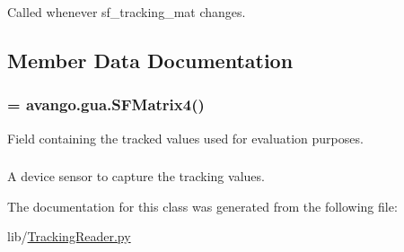 \-Called whenever sf\-\_\-tracking\-\_\-mat changes. 



\subsection{\-Member \-Data \-Documentation}
\hypertarget{classlib_1_1TrackingReader_1_1TrackingTargetReader_aa0b35ab4b2d285f046c0500404b0d0aa}{
\subsubsection[{sf\-\_\-tracking\-\_\-mat}]{ = avango.\-gua.\-S\-F\-Matrix4()}}\label{classlib_1_1TrackingReader_1_1TrackingTargetReader_aa0b35ab4b2d285f046c0500404b0d0aa}


\-Field containing the tracked values used for evaluation purposes. 

\hypertarget{classlib_1_1TrackingReader_1_1TrackingTargetReader_ad7b8c73f24cbcbe803b83699a1493de7}{
\subsubsection[{tracking\-\_\-sensor}]{}}\label{classlib_1_1TrackingReader_1_1TrackingTargetReader_ad7b8c73f24cbcbe803b83699a1493de7}


\-A device sensor to capture the tracking values. 



\-The documentation for this class was generated from the following file\-:\begin{DoxyCompactItemize}
\item 
lib/\hyperlink{TrackingReader_8py}{\-Tracking\-Reader.\-py}\end{DoxyCompactItemize}
